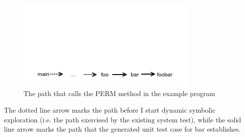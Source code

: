 \documentclass[proposal]{umthesis} %
\begin{document}
\begin{figure}[h]
\centering
\includegraphics[width=3.5in, trim=0in 0in 0in 2.0in, clip]{path.png}
\caption{The path that calls the PERM method in the example program}
\end{figure}

The dotted line arrow marks the path before I start dynamic symbolic exploration (i.e. the path exercised by the existing system test), while the solid line arrow marks the path that the generated unit test case for bar establishes. 
\end{document}
